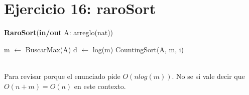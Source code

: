 \section{Ejercicio 16: raroSort}

\begin{algorithm}[H]
\caption{
    \textbf{RaroSort}(\textbf{in/out} A: arreglo(nat))
}
\begin{algorithmic}[1]
    \State m $\gets$ BuscarMax(A) 
    \State d $\gets$ log(m) 
     
        \State CountingSort(A, m, i) 
    \EndFor
\end{algorithmic}
 \\
Para revisar porque el enunciado pide $O(n log(m))$. No se si vale decir que $O(n+m) = O(n)$ en este contexto.
\end{algorithm}
